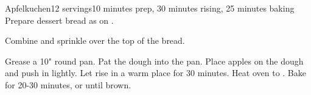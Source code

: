 \documentclass[../Cookbook.tex]{subfiles}
\begin{document}
\begin{recipe}[Apfelkuchen]{Apfelkuchen}{12 servings}{10 minutes prep, 30 minutes rising, 25 minutes baking}
	Prepare dessert bread as on .

	Combine and sprinkle over the top of the bread.
	
	Grease a 10" round pan.
	Pat the dough into the pan.
	Place apples on the dough and push in lightly.
	Let rise in a warm place for 30 minutes.
	Heat oven to .
	Bake for 20-30 minutes, or until brown.
\end{recipe}
\end{document}
